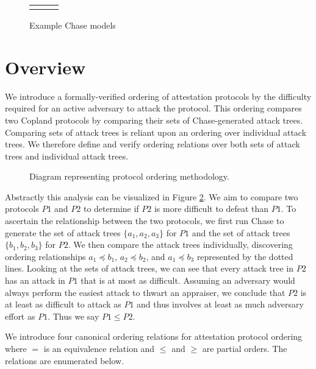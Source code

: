 \documentclass[runningheads]{llncs}
\theoremstyle{definition}
\begin{document}
\begin{figure}[hbtp]
    \centering 
    \begin{tabular}{m{3cm} m{3cm} m{3cm}}
         &  &  
    \end{tabular}
    \caption[Example Chase Models]{Example Chase models}
    \label{fig:chase-ex}
\end{figure}




\section{Overview}
We introduce a formally-verified ordering of attestation protocols by
the difficulty required for an active adversary to attack the
protocol. This ordering compares two Copland protocols by comparing
their sets of Chase-generated attack trees. Comparing sets of attack trees is reliant upon an ordering over individual attack trees.
We therefore define and verify ordering relations over both sets of attack trees and individual attack trees.

\begin{figure}[hbtp]
    \centering
    \captionsetup{justification=centering,margin=1cm}
    
    \caption[Protocol ordering abstraction]{Diagram representing protocol ordering methodology. }
    \label{fig:protocol-org-fig}
\end{figure}

Abstractly this analysis can be visualized in Figure
\ref{fig:protocol-org-fig}.  We aim to compare two protocols $P1$ and
$P2$ to determine if $P2$ is more difficult to defeat than $P1$. To
ascertain the relationship between the two protocols, we first run
Chase to generate the set of attack trees $\{ a_1, a_2, a_3\}$ for
$P1$ and the set of attack trees $\{b_1, b_2, b_3\}$ for $P2$. We then
compare the attack trees individually, discovering ordering
relationships $a_1 \preceq b_1$, $a_2 \preceq b_2$, and
$a_1 \preceq b_3$ represented by the dotted lines. Looking at
the sets of attack trees, we can see that every attack tree in $P2$
has an attack in $P1$ that is at most as difficult. Assuming an
adversary would always perform the easiest attack to thwart an
appraiser, we conclude that $P2$ is at least as difficult to attack as
$P1$ and thus involves at least as much adversary effort as $P1$. Thus
we say $P1 \leq P2$.

We introduce four canonical ordering relations for attestation
protocol ordering where $=$ is an equivalence relation and $\le$ and
$\ge$ are partial orders. The relations are enumerated below.
\end{document}
